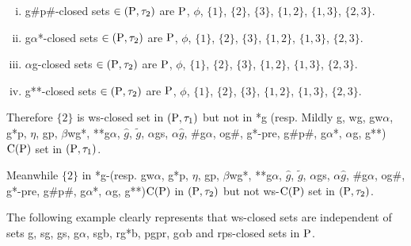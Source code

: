 \begin{exm}
\begin{enumerate}[(i)]
\item g\#p\#-closed sets $\in(\mathrm{P}, \tau_{2})$ are $\mathrm{P}$, $\phi$, $\{1\}$, $\{2\}$, $\{3\}$, $\{1, 2\}$, $\{1, 3\}$, $\{2, 3\}$.
\item g$\alpha$*-closed sets $\in(\mathrm{P}, \tau_{2})$ are $\mathrm{P}$, $\phi$, $\{1\}$, $\{2\}$, $\{3\}$, $\{1, 2\}$, $\{1, 3\}$, $\{2, 3\}$.
\item $\alpha$g-closed sets $\in(\mathrm{P}, \tau_{2})$ are $\mathrm{P}$, $\phi$, $\{1\}$, $\{2\}$, $\{3\}$, $\{1, 2\}$, $\{1, 3\}$, $\{2, 3\}$.
\item g{*}{*}-closed sets $\in(\mathrm{P}, \tau_{2})$ are $\mathrm{P}$, $\phi$, $\{1\}$, $\{2\}$, $\{3\}$, $\{1, 2\}$, $\{1, 3\}$, $\{2, 3\}$.
\end{enumerate}

Therefore $\{2\}$ is ws-closed set in $(\mathrm{P}, \tau_{1})$ but not in *g (resp. Mildly g, wg, gw$\alpha$, g*p, $\eta$, gp, $\beta$wg*, {*}{*}g$\alpha$, $\hat{g}$, $\tilde{g}$, $\alpha$gs, $\alpha\hat{g}$, \#g$\alpha$, og\#, g*-pre, g\#p\#, g$\alpha$*, $\alpha$g, g{*}{*})$\mathrm{C}(\mathrm{P})$ set in $(\mathrm{P},\tau_{1})$.

Meanwhile $\{2\}$ in *g-(resp. gw$\alpha$, g*p, $\eta$, gp, $\beta$wg*, {*}{*}g$\alpha$, $\hat{g}$, $\tilde{g}$, $\alpha$gs, $\alpha\hat{g}$, \#g$\alpha$, og\#, g*-pre, g\#p\#, g$\alpha$*, $\alpha$g, g{*}{*})$\mathrm{C}(\mathrm{P})$ in $(\mathrm{P}, \tau_{2})$ but not ws-$\mathrm{C}(\mathrm{P})$ set in $(\mathrm{P}, \tau_{2})$.
\end{exm}

\begin{rem}\label{rem2.1.3}
The following example clearly represents that ws-closed sets are independent of sets g, sg, gs, g$\alpha$, sgb, rg*b, pgpr, g$\alpha$b and rps-closed sets in $\mathrm{P}$.
\end{rem}

